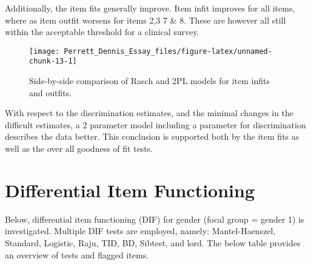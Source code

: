 \documentclass[
  man,floatsintext]{apa6}
\begin{document}
Additionally, the item fits generally improve. Item infit improves for all items, where as item outfit worsens for items 2,3 7 \& 8. These are however all still within the acceptable threshold for a clinical survey.

\begin{figure}

{\centering \texttt{[image: Perrett\_Dennis\_Essay\_files/figure-latex/unnamed-chunk-13-1]} 

}

\caption{Side-by-side comparison of Rasch and 2PL models for item infits and outfits.}\label{fig:unnamed-chunk-13}
\end{figure}

With respect to the discrimination estimates, and the minimal changes in the difficult estimates, a 2 parameter model including a parameter for discrimination describes the data better. This conclusion is supported both by the item fits as well as the over all goodness of fit tests.

\hypertarget{differential-item-functioning}{%
\section{Differential Item Functioning}\label{differential-item-functioning}}

Below, differential item functioning (DIF) for gender (focal group = gender 1) is investigated. Multiple DIF tests are employed, namely: Mantel-Haenszel, Standard, Logistic, Raju, TID, BD, Sibtest, and lord. The below table provides an overview of tests and flagged items.
\end{document}
